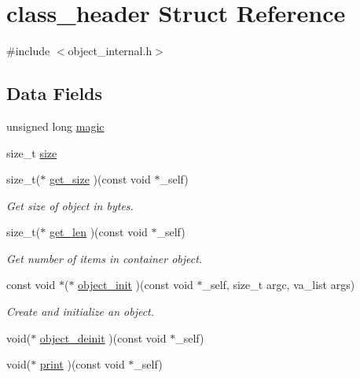 \hypertarget{structclass__header}{}\section{class\+\_\+header Struct Reference}
\label{structclass__header}


{\ttfamily \#include $<$object\+\_\+internal.\+h$>$}

\subsection*{Data Fields}
\begin{DoxyCompactItemize}
\item 
unsigned long \mbox{\hyperlink{structclass__header_aa98964036010ad63554856c5f4680cec}{magic}}
\item 
size\+\_\+t \mbox{\hyperlink{structclass__header_a5ba6bf54fc12a2a31a2b39937cd50e84}{size}}
\item 
size\+\_\+t($\ast$ \mbox{\hyperlink{structclass__header_a5c135b5316d0d9d22dce1f32fb8befb1}{get\+\_\+size}} )(const void $\ast$\+\_\+self)
\begin{DoxyCompactList}\small\item\em Get size of object in bytes. \end{DoxyCompactList}\item 
size\+\_\+t($\ast$ \mbox{\hyperlink{structclass__header_a1b7cb949741b9a64fd3569af94f30cba}{get\+\_\+len}} )(const void $\ast$\+\_\+self)
\begin{DoxyCompactList}\small\item\em Get number of items in container object. \end{DoxyCompactList}\item 
const void $\ast$($\ast$ \mbox{\hyperlink{structclass__header_a11011a70a48768fbe95790914ea808c9}{object\+\_\+init}} )(const void $\ast$\+\_\+self, size\+\_\+t argc, va\+\_\+list args)
\begin{DoxyCompactList}\small\item\em Create and initialize an object. \end{DoxyCompactList}\item 
void($\ast$ \mbox{\hyperlink{structclass__header_aa07a11a17f5d79a66c9086b8d10969b7}{object\+\_\+deinit}} )(const void $\ast$\+\_\+self)
\item 
void($\ast$ \mbox{\hyperlink{structclass__header_a23181c1eac1455a8f23dd9d14f8b6abd}{print}} )(const void $\ast$\+\_\+self)
\item 

\end{DoxyCompactItemize}
